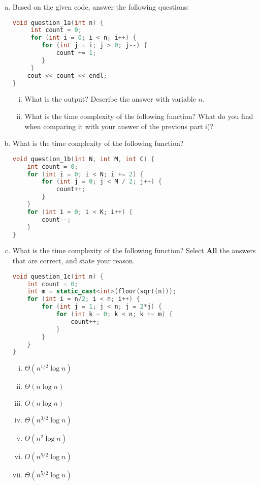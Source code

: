 \documentclass[11pt]{exam}
\begin{document}
\begin{enumerate}[(a)]

\item Based on the given code, answer the following questions:
\begin{lstlisting}[language=c++]
void question_1a(int n) {
	 int count = 0;
	 for (int i = 0; i < n; i++) {
	 	for (int j = i; j > 0; j--) {
	 		count += 1;
	 	}
	 }
	cout << count << endl;
}
\end{lstlisting}
\begin{enumerate}[i)]
\item What is the output? Describe the answer with variable $n$.
\item What is the time complexity of the following function? What do you find when comparing it with your answer of the previous part i)?
\end{enumerate}

\begin{solution}
\end{solution}

\item What is the time complexity of the following function?
\begin{lstlisting}[language=c++]
void question_1b(int N, int M, int C) {
	int count = 0;
	for (int i = 0; i < N; i += 2) {
		for (int j = 0; j < M / 2; j++) {
			count++;
		}
	}
	for (int i = 0; i < K; i++) {
		count--;
	}
}
\end{lstlisting}

\begin{solution}
\end{solution}

\item What is the time complexity of the following function? Select \textbf{All} the answers that are correct, and state your reason.
\begin{lstlisting}[language=c++]
void question_1c(int n) {
	int count = 0;
	int m = static_cast<int>(floor(sqrt(n)));
	for (int i = n/2; i < n; i++) {
		for (int j = 1; j < n; j = 2*j) {
			for (int k = 0; k < n; k += m) {
				count++;
			}
		}
	}
}
\end{lstlisting}
\begin{enumerate}[i)]
\item $\Theta(n^{1/2}\log n)$
\item $\Theta(n \log n)$
\item $O(n \log n)$
\item $\Theta(n^{3/2}\log n)$
\item $\Theta(n^2\log n)$
\item $O(n^{5/2}\log n)$
\item $\Theta(n^{5/2}\log n)$
\end{enumerate}
\begin{solution}
\end{solution}


\end{enumerate}
\end{document}

